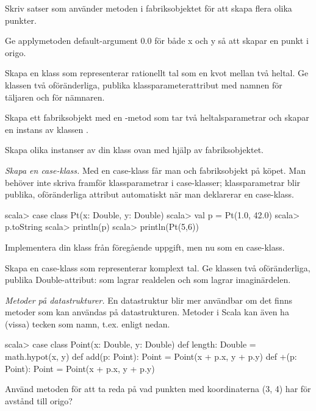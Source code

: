 \Subtask Skriv satser som använder metoden  i fabriksobjektet  för att skapa flera olika punkter.

\Subtask Ge applymetoden default-argument 0.0 för både x och y så att  skapar en punkt i origo.

\Subtask Skapa en klass  som representerar rationellt tal som en kvot mellan två heltal. Ge klassen två oföränderliga, publika klassparameterattribut med namnen  för täljaren och  för nämnaren. 

\Subtask Skapa ett fabriksobjekt med en -metod som tar två heltalsparametrar och skapar en instans av klassen .

\Subtask Skapa olika instanser av din klass  ovan med hjälp av fabriksobjektet.


\Task \emph{Skapa en case-klass.} Med en case-klass får man  och fabriksobjekt på köpet. Man behöver inte skriva  framför klassparametrar i case-klasser; klassparametrar blir publika, oföränderliga attribut automatiskt när man deklarerar en case-klass.

\begin{REPL}
scala> case class Pt(x: Double, y: Double) 
scala> val p = Pt(1.0, 42.0)
scala> p.toString
scala> println(p)
scala> println(Pt(5,6))
\end{REPL}

\Subtask Implementera din klass  från föregående uppgift, men nu som en case-klass.

\Subtask Skapa en case-klass  som representerar komplext tal. Ge klassen två oföränderliga, publika Double-attribut:  som lagrar realdelen och  som lagrar imaginärdelen. 

\Task \label{task:point} \emph{Metoder på datastrukturer.} En datastruktur blir mer användbar om det finns metoder som kan användas på datastrukturen. Metoder i Scala kan även ha (vissa) tecken som namn, t.ex. \code{+} enligt nedan.  
\begin{REPL}
scala> case class Point(x: Double, y: Double) {
         def length: Double = math.hypot(x, y)   
         def add(p: Point): Point = Point(x + p.x, y + p.y)
         def +(p: Point): Point = Point(x + p.x, y + p.y)
       }
\end{REPL}

\Subtask Använd metoden  för att ta reda på vad punkten med koordinaterna (3, 4) har för avstånd till origo?

